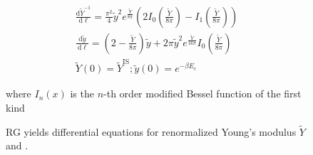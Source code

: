 \begin{frame}[c]
\begin{columns}
\begin{column}{0.45\linewidth}
\begin{overprint}
\begin{figure}
\vspace{30pt}
\begin{gather*}
\frac{\mathrm{d} \tilde{Y}^{-1}}{\mathrm{~d} \ell} =\frac{\pi^{2}}{4} \tilde{y}^{2} e^{\frac{\tilde{Y}}{8 \pi}}\left(2 I_{0}\left(\frac{\tilde{Y}}{8 \pi}\right)-I_{1}\left(\frac{\tilde{Y}}{8 \pi}\right)\right) 
\\
\frac{\mathrm{d} \tilde{y}}{\mathrm{~d} \ell} =\left(2-\frac{\tilde{Y}}{8 \pi}\right) \tilde{y}+2 \pi \tilde{y}^{2} e^{\frac{\tilde{Y}}{16 \pi}} I_{0}\left(\frac{\tilde{Y}}{8 \pi}\right) 
\\
\tilde{Y}(0) = \tilde{Y}^\mathrm{IS}; \tilde{y}(0) = e^{-\beta E_\mathrm{c}}
\end{gather*}

where $I_n(x)$ is the $n$-th order modified Bessel function of the first kind

\caption{
RG yields differential equations for renormalized Young's modulus $\tilde{Y}$ and .
} 

\end{figure}

\end{overprint}

\end{column}


\end{columns}


\end{frame}